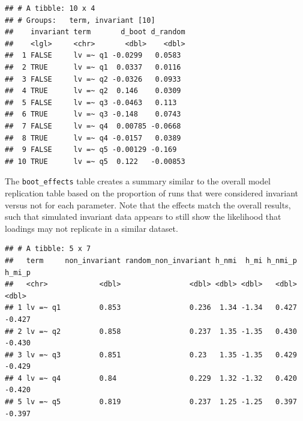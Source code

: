 \documentclass[
  man]{apa7}
\newenvironment{Shaded}{\begin{snugshade}}{\end{snugshade}}
\newcommand{\FunctionTok}[1]{\textcolor[rgb]{0.13,0.29,0.53}{\textbf{#1}}}
\newcommand{\NormalTok}[1]{#1}
\newcommand{\SpecialCharTok}[1]{\textcolor[rgb]{0.81,0.36,0.00}{\textbf{#1}}}
\begin{document}
\small

\begin{Shaded}
\end{Shaded}

\normalsize

\begin{verbatim}
## # A tibble: 10 x 4
## # Groups:   term, invariant [10]
##    invariant term       d_boot d_random
##    <lgl>     <chr>       <dbl>    <dbl>
##  1 FALSE     lv =~ q1 -0.0299   0.0583 
##  2 TRUE      lv =~ q1  0.0337   0.0116 
##  3 FALSE     lv =~ q2 -0.0326   0.0933 
##  4 TRUE      lv =~ q2  0.146    0.0309 
##  5 FALSE     lv =~ q3 -0.0463   0.113  
##  6 TRUE      lv =~ q3 -0.148    0.0743 
##  7 FALSE     lv =~ q4  0.00785 -0.0668 
##  8 TRUE      lv =~ q4 -0.0157   0.0389 
##  9 FALSE     lv =~ q5 -0.00129 -0.169  
## 10 TRUE      lv =~ q5  0.122   -0.00853
\end{verbatim}

The \texttt{boot\_effects} table creates a summary similar to the overall model replication table based on the proportion of runs that were considered invariant versus not for each parameter. Note that the effects match the overall results, such that simulated invariant data appears to still show the likelihood that loadings may not replicate in a similar dataset.

\small

\begin{Shaded}
\end{Shaded}

\normalsize

\begin{verbatim}
## # A tibble: 5 x 7
##   term     non_invariant random_non_invariant h_nmi  h_mi h_nmi_p h_mi_p
##   <chr>            <dbl>                <dbl> <dbl> <dbl>   <dbl>  <dbl>
## 1 lv =~ q1         0.853                0.236  1.34 -1.34   0.427 -0.427
## 2 lv =~ q2         0.858                0.237  1.35 -1.35   0.430 -0.430
## 3 lv =~ q3         0.851                0.23   1.35 -1.35   0.429 -0.429
## 4 lv =~ q4         0.84                 0.229  1.32 -1.32   0.420 -0.420
## 5 lv =~ q5         0.819                0.237  1.25 -1.25   0.397 -0.397
\end{verbatim}
\end{document}
